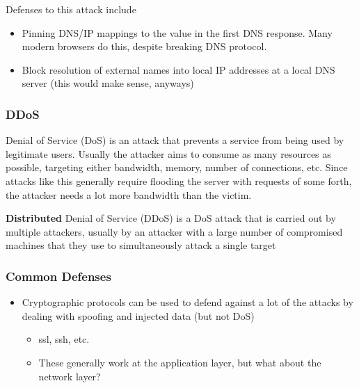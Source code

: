 \documentclass[../notes.tex]{subfiles}
\begin{document}

Defenses to this attack include
\begin{itemize}
    \item Pinning DNS/IP mappings to the value in the first DNS response. Many modern browsers do this, despite breaking DNS protocol.
    \item Block resolution of external names into local IP addresses at a local DNS server (this would make sense, anyways)
\end{itemize}



\subsubsection{DDoS}


\begin{definition}
    Denial of Service (DoS) is an attack that prevents a service from being used by legitimate users.
    Usually the attacker aims to consume as many resources as possible, targeting either bandwidth, memory, number of connections, etc.
    Since attacks like this generally require flooding the server with requests of some forth, the attacker needs a lot more bandwidth than the victim.

    \textbf{Distributed} Denial of Service (DDoS) is a DoS attack that is carried out by multiple attackers, usually by an attacker with a large number of compromised machines that they use to simultaneously attack a single target
\end{definition}





\subsubsection{Common Defenses}

\begin{itemize}
    \item Cryptographic protocols can be used to defend against a lot of the attacks by dealing with spoofing and injected data (but not DoS)
        \begin{itemize}
            \item ssl, ssh, etc.
            \item These generally work at the application layer, but what about the network layer?
        \end{itemize}
\end{itemize}
\end{document}
